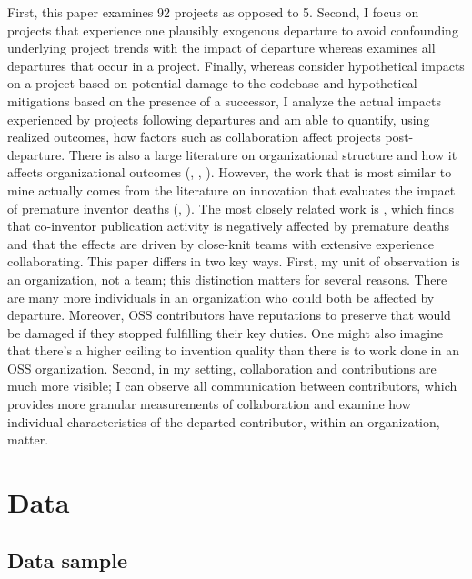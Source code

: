 \documentclass[12pt,notitlepage]{article}
\begin{document}
First, this paper examines 92 projects as opposed to 5. Second, I focus on projects that experience one plausibly exogenous departure to avoid confounding underlying project trends with the impact of departure whereas \cite{rigby_quantifying_2016} examines all departures that occur in a project. Finally, whereas \cite{rigby_quantifying_2016} consider hypothetical impacts on a project based on potential damage to the codebase and hypothetical mitigations based on the presence of a successor, I analyze the actual impacts experienced by projects following departures and am able to quantify, using realized outcomes, how factors such as collaboration affect projects post-departure. 
There is also a large literature on organizational structure and how it affects organizational outcomes (\cite{bloom_measuring_2007}, \cite{brynjolfsson_1_2012}, \cite{ichniowski_7_2012}). However, the work that is most similar to mine actually comes from the literature on innovation that evaluates the impact of premature inventor deaths (\cite{jaravel_team-specific_2018}, \cite{azoulay_does_2019}). The most closely related work is \cite{jaravel_team-specific_2018}, which finds that co-inventor publication activity is negatively affected by premature deaths and that the effects are driven by close-knit teams with extensive experience collaborating. This paper differs in two key ways. First, my unit of observation is an organization, not a team; this distinction matters for several reasons. There are many more individuals in an organization who could both be affected by departure. Moreover, OSS contributors have reputations to preserve that would be damaged if they stopped fulfilling their key duties. One might also imagine that there's a higher ceiling to invention quality than there is to work done in an OSS organization. Second, in my setting, collaboration and contributions are much more visible; I can observe all communication between contributors, which provides more granular measurements of collaboration and examine how individual characteristics of the departed contributor, within an organization, matter. 


\section{Data} \label{sec:data}
\subsection{Data sample}
\end{document}
